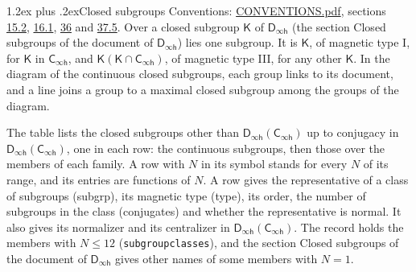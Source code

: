\documentclass[10pt,a4paper]{article}
\makeatletter
\renewcommand\section{\@startsection{section}{1}{\z@}{-3ex plus -1ex minus -.2ex}%
  {1.2ex plus .2ex}{\normalfont\large\sffamily\bfseries\color{parttitle}}}
\numberwithin{equation}{section}
\newcommand{\grp}[1]{\mathsf{#1}}
\makeatother
\begin{document}
\section{Closed subgroups}\label{s:subgroups}
Conventions: \href{../../CONVENTIONS.pdf}{CONVENTIONS.pdf}, sections \href{../../../rotation/CONVENTIONS.pdf\#conv.15.2}{15.2}, \href{../../../rotation/CONVENTIONS.pdf\#conv.16.1}{16.1}, \href{../../CONVENTIONS.pdf\#conv.36}{36} and \href{../../CONVENTIONS.pdf\#conv.37.5}{37.5}.
\leavevmode\label{n:group.subgroup.point}Over a closed subgroup $\grp{K}$ of $\grp{D_{\infty h}}$ (the section Closed subgroups of the document of \href{../../../rotation/data/pdf/Dinfh.pdf}{$\grp{D_{\infty h}}$}) lies one subgroup. It is $\grp{K}$, of magnetic type I, for $\grp{K}$ in $\grp{C_{\infty h}}$, and $\grp{K}(\grp{K} \cap \grp{C_{\infty h}})$, of magnetic type III, for any other $\grp{K}$. In the diagram of the continuous closed subgroups, each group links to its document, and a line joins a group to a maximal closed subgroup among the groups of the diagram.
\begin{center}\end{center}
The table lists the closed subgroups other than $\grp{D_{\infty h}}(\grp{C_{\infty h}})$ up to conjugacy in $\grp{D_{\infty h}}(\grp{C_{\infty h}})$, one in each row: the continuous subgroups, then those over the members of each family. \label{n:index.family.N}A row with $N$ in its symbol stands for every $N$ of its range, and its entries are functions of $N$. \label{n:head.subgroup}\label{n:head.magnetic.type}\label{n:head.order}\label{n:head.conjugates}\label{n:head.normal}A row gives the representative of a class of subgroups (subgrp), its magnetic type (type), its order, the number of subgroups in the class (conjugates) and whether the representative is normal. \label{n:head.normalizer}\label{n:head.centralizer}It also gives its normalizer and its centralizer in $\grp{D_{\infty h}}(\grp{C_{\infty h}})$. The record holds the members with $N \le 12$ (\texttt{subgroupclasses}), and the section Closed subgroups of the document of \href{../../../rotation/data/pdf/Dinfh.pdf}{$\grp{D_{\infty h}}$} gives other names of some members with $N = 1$.
\end{document}
